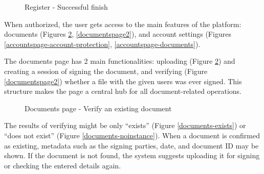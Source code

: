 \begin{figure}[H]
    \centering
    \caption{Register - Successful finish}
    \label{successregister}
\end{figure}

When authorized, the user gets access to the main features of the platform: documents (Figures \ref{documentspage1}, \ref{documentspage2}), and account settings (Figures \ref{accountspage-account-protection}, \ref{accountspage-documents}).

The documents page has 2 main functionalities: uploading (Figure \ref{documentspage1}) and creating a session of signing the document, and verifying (Figure \ref{documentspage2}) whether a file with the given users was ever signed. 
This structure makes the page a central hub for all document-related operations. 

\begin{figure}[H]
    \centering
    \caption{Documents page - Verify an existing document}
    \label{documentspage1}
\end{figure}

The results of verifying might be only ``exists'' (Figure \ref{documents-exists}) or ``does not exist'' (Figure \ref{documents-noinstance}). 
When a document is confirmed as existing, metadata such as the signing parties, date, and document ID may be shown. 
If the document is not found, the system suggests uploading it for signing or checking the entered details again.

